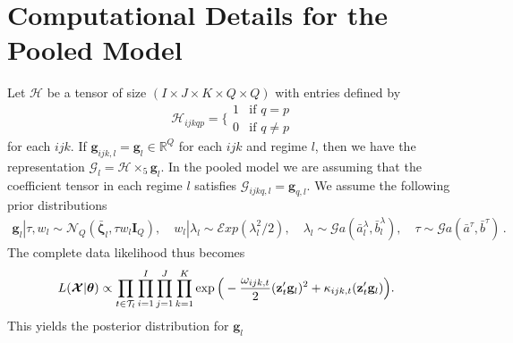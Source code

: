 \documentclass[12pt,a4paper]{article}
\def \R{\mathds{R}}
\theoremstyle{custom}
\begin{document}
\section{Computational Details for the Pooled Model} \label{sec:apdx_pooled}
Let $\mathcal{H}$ be a tensor of size $(I\times J\times K\times Q\times Q)$ with entries defined by
\begin{equation*}
\mathcal{H}_{ijkqp} = \Bigg\lbrace \begin{array}{cc}
1 & \text{if } q = p \\
0 & \text{if } q \neq p
\end{array}
\end{equation*}
for each $ijk$. If $\mathbf{g}_{ijk,l} = \mathbf{g}_l \in \R^Q$ for each $ijk$ and regime $l$, then we have the representation $\mathcal{G}_l = \mathcal{H} \times_5 \mathbf{g}_l$.
In the pooled model we are assuming that the coefficient tensor in each regime $l$ satisfies $\mathcal{G}_{ijkq,l} = \mathbf{g}_{q,l}$. We assume the following prior distributions
\begin{align*}
\mathbf{g}_l | \tau,w_l \sim \mathcal{N}_Q(\bar{\boldsymbol{\zeta}}_l,\tau w_l \mathbf{I}_Q), \quad w_l|\lambda_l \sim \mathcal{E}xp(\lambda_l^2/2), \quad \lambda_l \sim \mathcal{G}a(\bar{a}_l^\lambda,\bar{b}_l^\lambda), \quad \tau \sim \mathcal{G}a(\bar{a}^\tau,\bar{b}^\tau) \, .
\end{align*}
The complete data likelihood thus becomes
\begin{align*}
\notag
L(\boldsymbol{\mathcal{X}}|\boldsymbol{\theta}) & \propto \prod_{t\in\mathcal{T}_l} \prod_{i=1}^I \prod_{j=1}^J \prod_{k=1}^K \exp\Big( -\frac{\omega_{ijk,t}}{2}(\mathbf{z}_t' \mathbf{g}_l)^2 +\kappa_{ijk,t}(\mathbf{z}_t' \mathbf{g}_l) \Big).
\end{align*}
This yields the posterior distribution for $\mathbf{g}_l$
\end{document}
